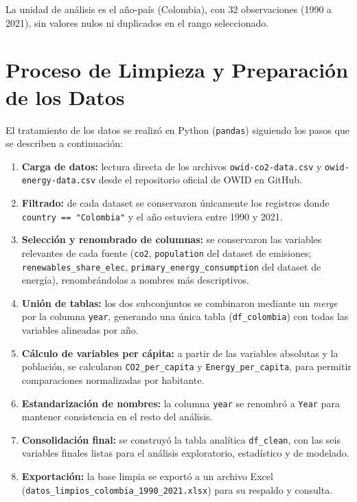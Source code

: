 \documentclass[11pt]{article}
\begin{document}
La unidad de análisis es el año-país (Colombia), con 32 observaciones (1990 a 2021), sin valores nulos ni duplicados en el rango seleccionado.

\section{Proceso de Limpieza y Preparación de los Datos}

El tratamiento de los datos se realizó en Python (\texttt{pandas}) siguiendo los pasos que se describen a continuación:

\begin{enumerate}[leftmargin=1.2cm]
    \item \textbf{Carga de datos:} lectura directa de los archivos \texttt{owid-co2-data.csv} y \texttt{owid-energy-data.csv} desde el repositorio oficial de OWID en GitHub.
    \item \textbf{Filtrado:} de cada dataset se conservaron únicamente los registros donde \texttt{country == "Colombia"} y el año estuviera entre 1990 y 2021.
    \item \textbf{Selección y renombrado de columnas:} se conservaron las variables relevantes de cada fuente (\texttt{co2}, \texttt{population} del dataset de emisiones; \texttt{renewables\_share\_elec}, \texttt{primary\_energy\_consumption} del dataset de energía), renombrándolas a nombres más descriptivos.
    \item \textbf{Unión de tablas:} los dos subconjuntos se combinaron mediante un \textit{merge} por la columna \texttt{year}, generando una única tabla (\texttt{df\_colombia}) con todas las variables alineadas por año.
    \item \textbf{Cálculo de variables per cápita:} a partir de las variables absolutas y la población, se calcularon \texttt{CO2\_per\_capita} y \texttt{Energy\_per\_capita}, para permitir comparaciones normalizadas por habitante.
    \item \textbf{Estandarización de nombres:} la columna \texttt{year} se renombró a \texttt{Year} para mantener consistencia en el resto del análisis.
    \item \textbf{Consolidación final:} se construyó la tabla analítica \texttt{df\_clean}, con las seis variables finales listas para el análisis exploratorio, estadístico y de modelado.
    \item \textbf{Exportación:} la base limpia se exportó a un archivo Excel (\texttt{datos\_limpios\_colombia\_1990\_2021.xlsx}) para su respaldo y consulta.
\end{enumerate}
\end{document}
